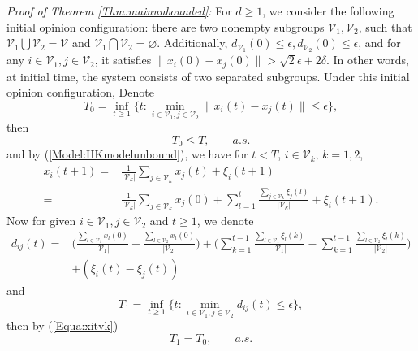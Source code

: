 \documentclass[11pt]{article}
\theoremstyle{definition}
\theoremstyle{remark}
\numberwithin{equation}{section}
\begin{document}
\emph{Proof of Theorem \ref{Thm:mainunbounded}:}
For $d\geq 1$, we consider the following initial opinion configuration: there are two nonempty subgroups $\mathcal{V}_1, \mathcal{V}_2$, such that $\mathcal{V}_1\bigcup \mathcal{V}_2=\mathcal{V}$ and $\mathcal{V}_1\bigcap \mathcal{V}_2=\varnothing$. Additionally, $d_{\mathcal{V}_1}(0)\leq \epsilon,d_{\mathcal{V}_2}(0)\leq \epsilon$, and for any $i\in\mathcal{V}_1, j\in\mathcal{V}_2$, it satisfies $\| x_i(0)-x_j(0)\| >\sqrt{2}\epsilon+2\delta$. In other words, at initial time, the system consists of two separated subgroups. Under this initial opinion configuration,
Denote
\begin{equation*}
  T_0=\inf\limits_{t\geq 1}\Big\{t: \min\limits_{i\in\mathcal{V}_1, j\in\mathcal{V}_2}\| x_i(t)-x_j(t)\|\leq \epsilon\Big\},
\end{equation*}
then
\begin{equation}\label{Equa:T0leqT}
  T_0\leq T,\qquad a.s.
\end{equation}
and by (\ref{Model:HKmodelunbound}), we have for $t<T$, $i\in \mathcal{V}_k,\, k=1,2$,
\begin{equation}\label{Equa:xitvk}
\begin{split}
  x_i(t+1)=&\frac{1}{|\mathcal{V}_k|}\sum\limits_{j\in\mathcal{V}_k}x_j(t)+\xi_i(t+1)\\
  =&\frac{1}{|\mathcal{V}_k|}\sum\limits_{j\in\mathcal{V}_k}x_j(0)+\sum\limits_{l=1}^{t}\frac{\sum_{j\in\mathcal{V}_k}\xi_j(l)}{|\mathcal{V}_k|}+\xi_i(t+1).
  \end{split}
\end{equation}
Now for given $i\in\mathcal{V}_1, j\in\mathcal{V}_2$ and $t\geq 1$, we denote
\begin{equation}\label{Equa:dij1}
\begin{split}
  d_{ij}(t)=&\bigg(\frac{\sum_{l\in\mathcal{V}_1}x_l(0)}{|\mathcal{V}_1|}-\frac{\sum_{l\in\mathcal{V}_2}x_l(0)}{|\mathcal{V}_2|}\bigg)+
  \bigg(\sum\limits_{k=1}^{t-1}\frac{\sum_{l\in\mathcal{V}_1}\xi_l(k)}{|\mathcal{V}_1|}-\sum\limits_{k=1}^{t-1}\frac{\sum_{l\in\mathcal{V}_2}\xi_l(k)}{|\mathcal{V}_2|}\bigg)\\
  &+(\xi_i(t)-\xi_j(t))
\end{split}
\end{equation}
and
\begin{equation}\label{Equa:defiT1}
  T_1=\inf\limits_{t\geq 1}\{t: \min\limits_{i\in\mathcal{V}_1, j\in\mathcal{V}_2} d_{ij}(t)\leq \epsilon\},
\end{equation}
then by (\ref{Equa:xitvk})
\begin{equation}\label{Equa:T1leqT0}
  T_1= T_0,\qquad a.s.
\end{equation}
\end{document}
